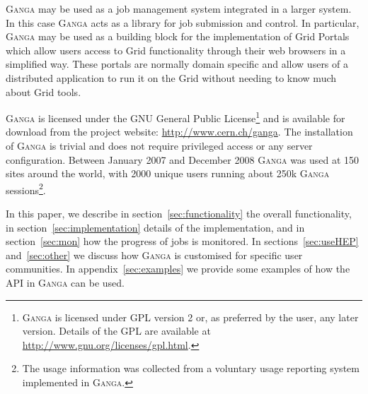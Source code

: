 \documentclass{elsart}
\def\ganga {\textsc{Ganga}\xspace}
\def\grid {Grid\xspace}
\begin{document}
\ganga may be used as a job management system integrated in a larger system. In this
case \ganga acts as a library for job submission and control. In particular,
\ganga may be used as a building block for the implementation of \grid Portals
which allow users access to \grid functionality through
their web browsers in a simplified way. These portals are normally
domain specific and allow users of a distributed application to run it
on the \grid without needing to know much about \grid tools. 

\ganga is licensed under the GNU General Public
License\footnote{\ganga is licensed under GPL version 2 or, as preferred by
the user, any later version.  Details of the GPL are available at
\url{http://www.gnu.org/licenses/gpl.html}.} and is available for download from
the project website: \url{http://www.cern.ch/ganga}. The installation of \ganga is trivial and
does not require privileged access or any server configuration. 
Between January 2007 and December 2008 \ganga was
used at 150 sites around the world, with 2000 unique users running about 250k %
\ganga sessions\footnote{The usage information was collected from a voluntary
  usage reporting system implemented in \ganga.}.

In this paper, we describe in section~\ref{sec:functionality} the overall
functionality, in section~\ref{sec:implementation} details of the
implementation, and in section~\ref{sec:mon} how the progress of jobs is
monitored. In sections~\ref{sec:useHEP} and~\ref{sec:other} we discuss how
\ganga is customised for specific user communities. In
appendix~\ref{sec:examples} we provide some examples of how the API in \ganga
can be used.
\end{document}
